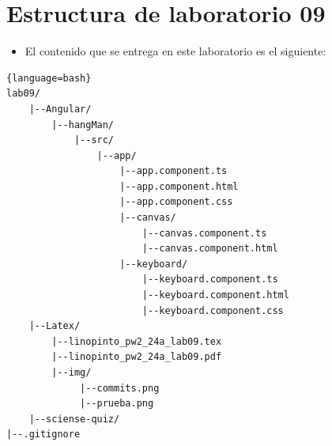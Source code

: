 \documentclass{article}
\newcommand{\itemPracticeNumber}{09}
\begin{document}
\section{Estructura de laboratorio \itemPracticeNumber}
\begin{itemize}
	\item El contenido que se entrega en este laboratorio es el siguiente:
\end{itemize}
\begin{lstlisting}{language=bash}
lab09/
	|--Angular/
		|--hangMan/
			|--src/
				|--app/
					|--app.component.ts
					|--app.component.html
					|--app.component.css
					|--canvas/
						|--canvas.component.ts
						|--canvas.component.html
					|--keyboard/
						|--keyboard.component.ts
						|--keyboard.component.html
						|--keyboard.component.css
	|--Latex/
		|--linopinto_pw2_24a_lab09.tex
		|--linopinto_pw2_24a_lab09.pdf
		|--img/
			 |--commits.png
			 |--prueba.png
	|--sciense-quiz/
|--.gitignore
\end{lstlisting}
\end{document}
